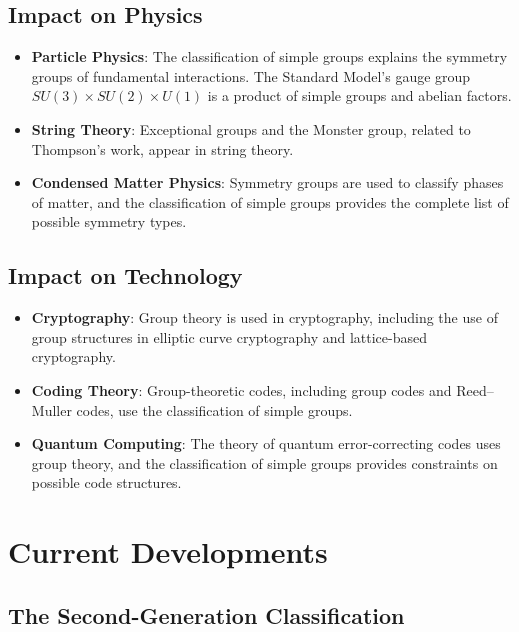 \subsection{Impact on Physics}

\begin{itemize}
\item \textbf{Particle Physics}: The classification of simple groups explains the symmetry groups of fundamental interactions. The Standard Model's gauge group $SU(3) \times SU(2) \times U(1)$ is a product of simple groups and abelian factors.

\item \textbf{String Theory}: Exceptional groups and the Monster group, related to Thompson's work, appear in string theory.

\item \textbf{Condensed Matter Physics}: Symmetry groups are used to classify phases of matter, and the classification of simple groups provides the complete list of possible symmetry types.
\end{itemize}

\subsection{Impact on Technology}

\begin{itemize}
\item \textbf{Cryptography}: Group theory is used in cryptography, including the use of group structures in elliptic curve cryptography and lattice-based cryptography.

\item \textbf{Coding Theory}: Group-theoretic codes, including group codes and Reed--Muller codes, use the classification of simple groups.

\item \textbf{Quantum Computing}: The theory of quantum error-correcting codes uses group theory, and the classification of simple groups provides constraints on possible code structures.
\end{itemize}

\section{Current Developments}

\subsection{The Second-Generation Classification}

